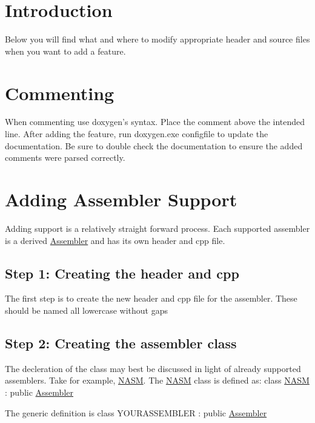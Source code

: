 \hypertarget{index_intro_sec}{}\section{Introduction}\label{index_intro_sec}
Below you will find what and where to modify appropriate header and source files when you want to add a feature.\hypertarget{index_section1}{}\section{Commenting}\label{index_section1}
When commenting use doxygen's syntax. Place the comment above the intended line. After adding the feature, run doxygen.\+exe configfile to update the documentation. Be sure to double check the documentation to ensure the added comments were parsed correctly.\hypertarget{index_section2}{}\section{Adding Assembler Support}\label{index_section2}
Adding support is a relatively straight forward process. Each supported assembler is a derived \hyperlink{class_assembler}{Assembler} and has its own header and cpp file.\hypertarget{index_step1}{}\subsection{Step 1\+: Creating the header and cpp}\label{index_step1}
The first step is to create the new header and cpp file for the assembler. These should be named all lowercase without gaps\hypertarget{index_step2}{}\subsection{Step 2\+: Creating the assembler class}\label{index_step2}
The decleration of the class may best be discussed in light of already supported assemblers. Take for example, \hyperlink{class_n_a_s_m}{N\+A\+S\+M}. The \hyperlink{class_n_a_s_m}{N\+A\+S\+M} class is defined as\+: class \hyperlink{class_n_a_s_m}{N\+A\+S\+M} \+: public \hyperlink{class_assembler}{Assembler}

The generic definition is class Y\+O\+U\+R\+A\+S\+S\+E\+M\+B\+L\+E\+R \+: public \hyperlink{class_assembler}{Assembler}

